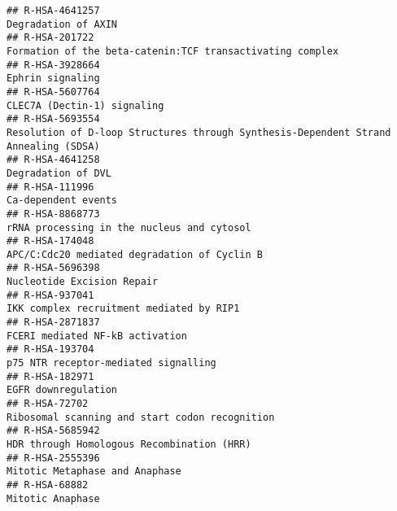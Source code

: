 \documentclass[
]{article}
\begin{document}
\begin{verbatim}
## R-HSA-4641257                                                                                                                  Degradation of AXIN
## R-HSA-201722                                                                             Formation of the beta-catenin:TCF transactivating complex
## R-HSA-3928664                                                                                                                     Ephrin signaling
## R-HSA-5607764                                                                                                          CLEC7A (Dectin-1) signaling
## R-HSA-5693554                                                  Resolution of D-loop Structures through Synthesis-Dependent Strand Annealing (SDSA)
## R-HSA-4641258                                                                                                                   Degradation of DVL
## R-HSA-111996                                                                                                                   Ca-dependent events
## R-HSA-8868773                                                                                           rRNA processing in the nucleus and cytosol
## R-HSA-174048                                                                                          APC/C:Cdc20 mediated degradation of Cyclin B
## R-HSA-5696398                                                                                                           Nucleotide Excision Repair
## R-HSA-937041                                                                                              IKK complex recruitment mediated by RIP1
## R-HSA-2871837                                                                                                      FCERI mediated NF-kB activation
## R-HSA-193704                                                                                                  p75 NTR receptor-mediated signalling
## R-HSA-182971                                                                                                                   EGFR downregulation
## R-HSA-72702                                                                                         Ribosomal scanning and start codon recognition
## R-HSA-5685942                                                                                           HDR through Homologous Recombination (HRR)
## R-HSA-2555396                                                                                                       Mitotic Metaphase and Anaphase
## R-HSA-68882                                                                                                                       Mitotic Anaphase

\end{verbatim}
\end{document}
